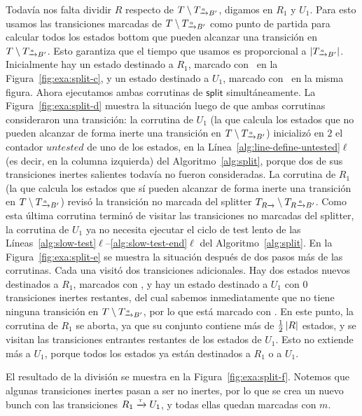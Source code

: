 \begin{example}
Todavía nos falta dividir $R$ respecto de $T \setminus \TaB$, digamos en $R_1$ y $U_1$.
Para esto usamos las transiciones marcadas de $T \setminus \TaB$ como punto de partida para calcular todos los estados bottom que pueden alcanzar una transición en $T \setminus \TaB$.
Esto garantiza que el tiempo que usamos es proporcional a $\size{\TaB}$.
Inicialmente hay un estado destinado a $R_1$, marcado con \redstatetext\ en la Figura~\ref{fig:exa:split-c}, y un estado destinado a $U_1$, marcado con \bluestatetext\ en la misma figura.
Ahora ejecutamos ambas corrutinas de $\mathsf{split}$ simultáneamente.
La Figura~\ref{fig:exa:split-d} muestra la situación luego de que ambas corrutinas consideraron una transición:
la corrutina de $U_1$ (la que calcula los estados que no pueden alcanzar de forma inerte una transición en $T \setminus \TaB$) inicializó en $2$ el contador $\mathit{untested}$ de uno de los estados, en la Línea~\ref{alg:line-define-untested}$\ell$ (es decir, en la columna izquierda) del Algoritmo~\ref{alg:split},
porque dos de sus transiciones inertes salientes todavía no fueron consideradas.
La corrutina de $R_1$ (la que calcula los estados que sí pueden alcanzar de forma inerte una transición en $T \setminus \TaB$) revisó la transición no marcada del splitter $T_{R\pijl{}} \setminus T_{R \pijl{a} B'}$.
Como esta última corrutina terminó de visitar las transiciones no marcadas del splitter,
la corrutina de $U_1$ ya no necesita ejecutar el ciclo de test lento de las Líneas~\ref{alg:slow-test}$\ell$--\ref{alg:slow-test-end}$\ell$ del Algoritmo~\ref{alg:split}.
En la Figura~\ref{fig:exa:split-e} se muestra la situación después de dos pasos más de las corrutinas.
Cada una visitó dos transiciones adicionales.
Hay dos estados nuevos destinados a $R_1$, marcados con \redstatetext,
y hay un estado destinado a $U_1$ con $0$ transiciones inertes restantes,
del cual sabemos inmediatamente que no tiene ninguna transición en $T \setminus \TaB$, por lo que está marcado con \bluestatetext.
En este punto, la corrutina de $R_1$ se aborta, ya que su conjunto contiene más de $\frac{1}{2}\left\lvert R \right\rvert$ estados,
y se visitan las transiciones entrantes restantes de los estados de $U_1$.
Esto no extiende más a $U_1$, porque todos los estados ya están destinados a $R_1$ o a $U_1$.

El resultado de la división se muestra en la Figura~\ref{fig:exa:split-f}.
Notemos que algunas transiciones inertes pasan a ser no inertes,
por lo que se crea un nuevo bunch con las transiciones $R_1 \pijl{\tau} U_1$,
y todas ellas quedan marcadas con {\color{red}$m$}.


\end{example}

